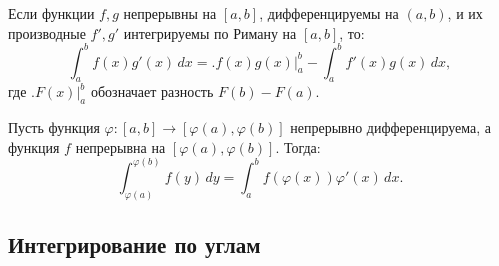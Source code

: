 \begin{theorem}\label{thm:int-by-parts}
Если функции $f, g$ непрерывны на $[a, b]$, дифференцируемы на $(a, b)$, и их производные $f', g'$ интегрируемы по Риману на $[a, b]$, то:
\[
\int_a^b f(x)g'(x) \, dx = \big.f(x)g(x)\big|_a^b - \int_a^b f'(x)g(x) \, dx,
\]
где $\big.F(x)\big|_a^b$ обозначает разность $F(b) - F(a)$.
\end{theorem}

\begin{theorem}\label{thm:change-of-var}
Пусть функция $\varphi \colon [a, b] \to [\varphi(a), \varphi(b)]$ непрерывно дифференцируема, а функция $f$ непрерывна на $[\varphi(a), \varphi(b)]$. Тогда:
\[
\int_{\varphi(a)}^{\varphi(b)} f(y) \, dy = \int_a^b f(\varphi(x)) \varphi'(x) \, dx.
\]
\end{theorem}

\subsection{Интегрирование по углам}